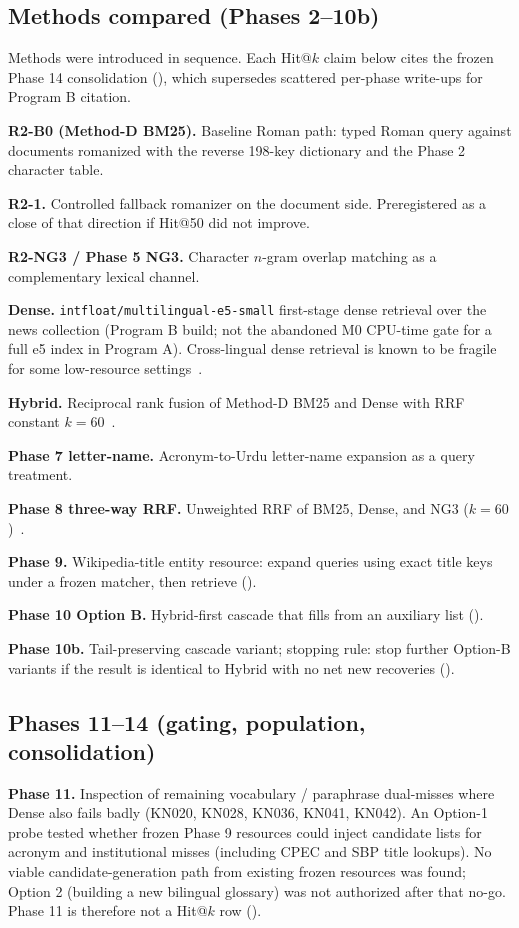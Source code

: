 \documentclass[10pt,letterpaper]{article}
\begin{document}
\subsection*{Methods compared (Phases 2--10b)}

Methods were introduced in sequence. Each Hit@$k$ claim below cites the frozen Phase 14 consolidation (), which supersedes scattered per-phase write-ups for Program B citation.

\textbf{R2-B0 (Method-D BM25).} Baseline Roman path: typed Roman query against documents romanized with the reverse 198-key dictionary and the Phase 2 character table.

\textbf{R2-1.} Controlled fallback romanizer on the document side. Preregistered as a close of that direction if Hit@50 did not improve.

\textbf{R2-NG3 / Phase 5 NG3.} Character $n$-gram overlap matching as a complementary lexical channel.

\textbf{Dense.} \texttt{intfloat/multilingual-e5-small} first-stage dense retrieval over the news collection (Program B build; not the abandoned M0 CPU-time gate for a full e5 index in Program A). Cross-lingual dense retrieval is known to be fragile for some low-resource settings~\cite{bib7,bib8}.

\textbf{Hybrid.} Reciprocal rank fusion of Method-D BM25 and Dense with RRF constant $k = 60$~\cite{bib15}.

\textbf{Phase 7 letter-name.} Acronym-to-Urdu letter-name expansion as a query treatment.

\textbf{Phase 8 three-way RRF.} Unweighted RRF of BM25, Dense, and NG3 ($k = 60$)~\cite{bib15}.

\textbf{Phase 9.} Wikipedia-title entity resource: expand queries using exact title keys under a frozen matcher, then retrieve ().

\textbf{Phase 10 Option B.} Hybrid-first cascade that fills from an auxiliary list ().

\textbf{Phase 10b.} Tail-preserving cascade variant; stopping rule: stop further Option-B variants if the result is identical to Hybrid with no net new recoveries ().

\subsection*{Phases 11--14 (gating, population, consolidation)}

\textbf{Phase 11.} Inspection of remaining vocabulary / paraphrase dual-misses where Dense also fails badly (KN020, KN028, KN036, KN041, KN042). An Option-1 probe tested whether frozen Phase 9 resources could inject candidate lists for acronym and institutional misses (including CPEC and SBP title lookups). No viable candidate-generation path from existing frozen resources was found; Option 2 (building a new bilingual glossary) was not authorized after that no-go. Phase 11 is therefore not a Hit@$k$ row ().
\end{document}
